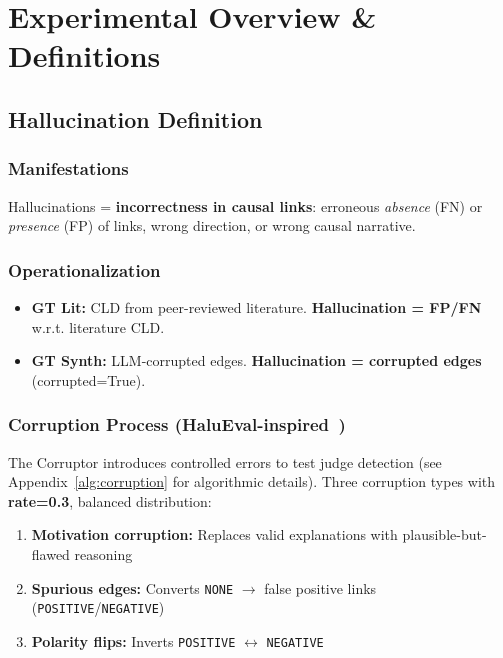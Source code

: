 \section{Experimental Overview \& Definitions}

\subsection{Hallucination Definition}
\label{sec:hallucination_definition}

\subsubsection{Manifestations}
Hallucinations = \textbf{incorrectness in causal links}: erroneous \textit{absence} (FN) or \textit{presence} (FP) of links, wrong direction, or wrong causal narrative.

\subsubsection{Operationalization}
\begin{itemize}[noitemsep]
    \item \textbf{GT Lit:} CLD from peer-reviewed literature. \textbf{Hallucination = FP/FN} w.r.t. literature CLD.
    \item \textbf{GT Synth:} LLM-corrupted edges. \textbf{Hallucination = corrupted edges} (corrupted=True).
\end{itemize}

\subsubsection{Corruption Process (HaluEval-inspired~\cite{li2023halueval})}
The Corruptor introduces controlled errors to test judge detection (see Appendix~\ref{alg:corruption} for algorithmic details). Three corruption types with \textbf{rate=0.3}, balanced distribution:
\begin{enumerate}[noitemsep]
    \item \textbf{Motivation corruption:} Replaces valid explanations with plausible-but-flawed reasoning
    \item \textbf{Spurious edges:} Converts \texttt{NONE} $\rightarrow$ false positive links (\texttt{POSITIVE}/\texttt{NEGATIVE})
    \item \textbf{Polarity flips:} Inverts \texttt{POSITIVE} $\leftrightarrow$ \texttt{NEGATIVE}
\end{enumerate}

